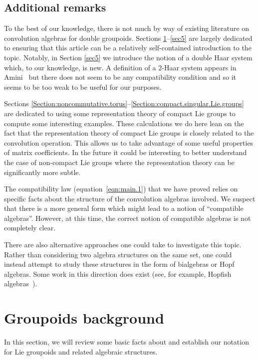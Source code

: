 \documentclass[pdftex]{sigma}
\numberwithin{equation}{section}
\theoremstyle{definition}
\begin{document}
\subsection{Additional remarks}
To the best of our knowledge, there is not much by way of existing literature on convolution algebras for double groupoids. Sections \ref{sec2}--\ref{sec5} are largely dedicated to ensuring that this article can be a relatively self-contained introduction to the topic. Notably, in Section \ref{sec5} we introduce the notion of a double Haar system which, to our knowledge, is new. A definition of a $ 2$-Haar system appears in Amini~\cite{Amini} but there does not seem to be any compatibility condition and so it seems to be too weak to be useful for our purposes.

Sections \ref{Section:noncommutative.torus}--\ref{Section:compact.singular.Lie.groups} are dedicated to using some representation theory of compact Lie groups to compute some interesting examples. These calculations we do here lean on the fact that the representation theory of compact Lie groups is closely related to the convolution operation. This allows us to take advantage of some useful properties of matrix coefficients. In the future it could be interesting to better understand the case of non-compact Lie groups where the representation theory can be significantly more subtle.

The compatibility law (equation~\eqref{eqn:main.1}) that we have proved relies on specific facts about the structure of the convolution algebras involved. We suspect that there is a more general form which might lead to a notion of ``compatible algebras''. However, at this time, the correct notion of compatible algebras is not completely clear.

There are also alternative approaches one could take to investigate this topic. Rather than considering two algebra structures on the same set, one could instead attempt to study these structures in the form of bialgebras or Hopf algebras. Some work in this direction does exist (see, for example, Hopfish algebras~\cite{Hopfish2,Hopfish}).

\section{Groupoids background}\label{sec2}
In this section, we will review some basic facts about and establish our notation for Lie groupoids and related algebraic structures.
\end{document}
